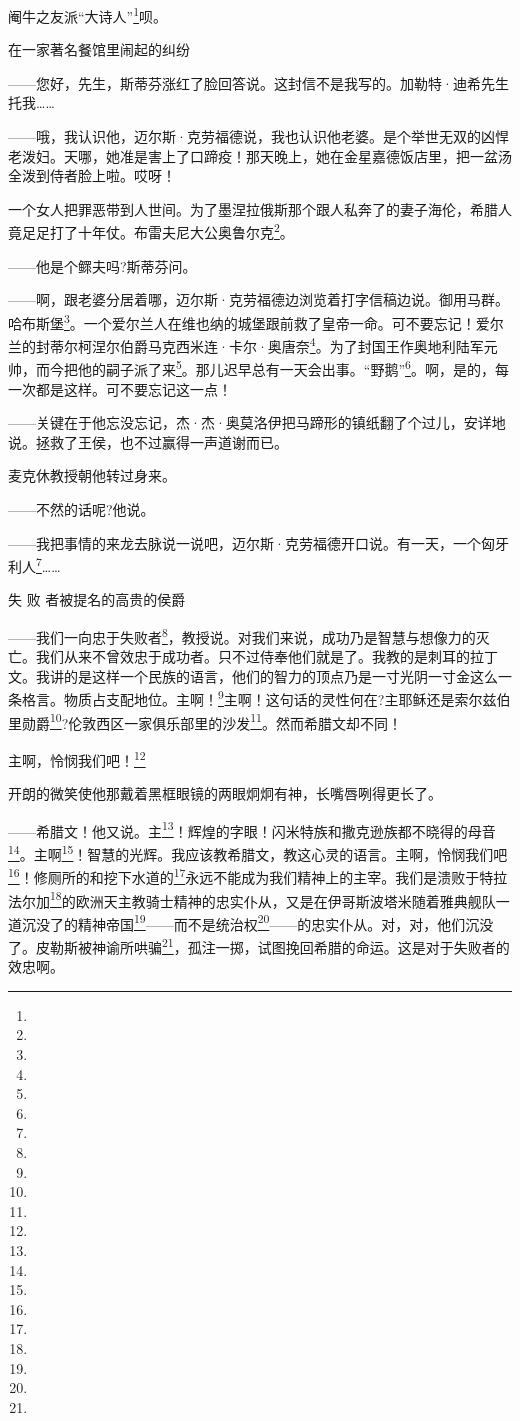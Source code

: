 \par 阉牛之友派“大诗人”\footnote{}呗。
\par 在一家著名餐馆里闹起的纠纷
\par ——您好，先生，斯蒂芬涨红了脸回答说。这封信不是我写的。加勒特·迪希先生托我……
\par ——哦，我认识他，迈尔斯·克劳福德说，我也认识他老婆。是个举世无双的凶悍老泼妇。天哪，她准是害上了口蹄疫！那天晚上，她在金星嘉德饭店里，把一盆汤全泼到侍者脸上啦。哎呀！
\par 一个女人把罪恶带到人世间。为了墨涅拉俄斯那个跟人私奔了的妻子海伦，希腊人竟足足打了十年仗。布雷夫尼大公奥鲁尔克\footnote{}。
\par ——他是个鳏夫吗?斯蒂芬问。
\par ——啊，跟老婆分居着哪，迈尔斯·克劳福德边浏览着打字信稿边说。御用马群。哈布斯堡\footnote{}。一个爱尔兰人在维也纳的城堡跟前救了皇帝一命。可不要忘记！爱尔兰的封蒂尔柯涅尔伯爵马克西米连·卡尔·奥唐奈\footnote{}。为了封国王作奥地利陆军元帅，而今把他的嗣子派了来\footnote{}。那儿迟早总有一天会出事。“野鹅”\footnote{}。啊，是的，每一次都是这样。可不要忘记这一点！
\par ——关键在于他忘没忘记，杰·杰·奥莫洛伊把马蹄形的镇纸翻了个过儿，安详地说。拯救了王侯，也不过赢得一声道谢而已。
\par 麦克休教授朝他转过身来。
\par ——不然的话呢?他说。
\par ——我把事情的来龙去脉说一说吧，迈尔斯·克劳福德开口说。有一天，一个匈牙利人\footnote{}……
\par 失 败 者被提名的高贵的侯爵
\par ——我们一向忠于失败者\footnote{}，教授说。对我们来说，成功乃是智慧与想像力的灭亡。我们从来不曾效忠于成功者。只不过侍奉他们就是了。我教的是刺耳的拉丁文。我讲的是这样一个民族的语言，他们的智力的顶点乃是一寸光阴一寸金这么一条格言。物质占支配地位。主啊！\footnote{}主啊！这句话的灵性何在?主耶稣还是索尔兹伯里勋爵\footnote{}?伦敦西区一家俱乐部里的沙发\footnote{}。然而希腊文却不同！
\par 主啊，怜悯我们吧！\footnote{}
\par 开朗的微笑使他那戴着黑框眼镜的两眼炯炯有神，长嘴唇咧得更长了。
\par ——希腊文！他又说。主\footnote{}！辉煌的字眼！闪米特族和撒克逊族都不晓得的母音\footnote{}。主啊\footnote{}！智慧的光辉。我应该教希腊文，教这心灵的语言。主啊，怜悯我们吧\footnote{}！修厕所的和挖下水道的\footnote{}永远不能成为我们精神上的主宰。我们是溃败于特拉法尔加\footnote{}的欧洲天主教骑士精神的忠实仆从，又是在伊哥斯波塔米随着雅典舰队一道沉没了的精神帝国\footnote{}——而不是统治权\footnote{}——的忠实仆从。对，对，他们沉没了。皮勒斯被神谕所哄骗\footnote{}，孤注一掷，试图挽回希腊的命运。这是对于失败者的效忠啊。
